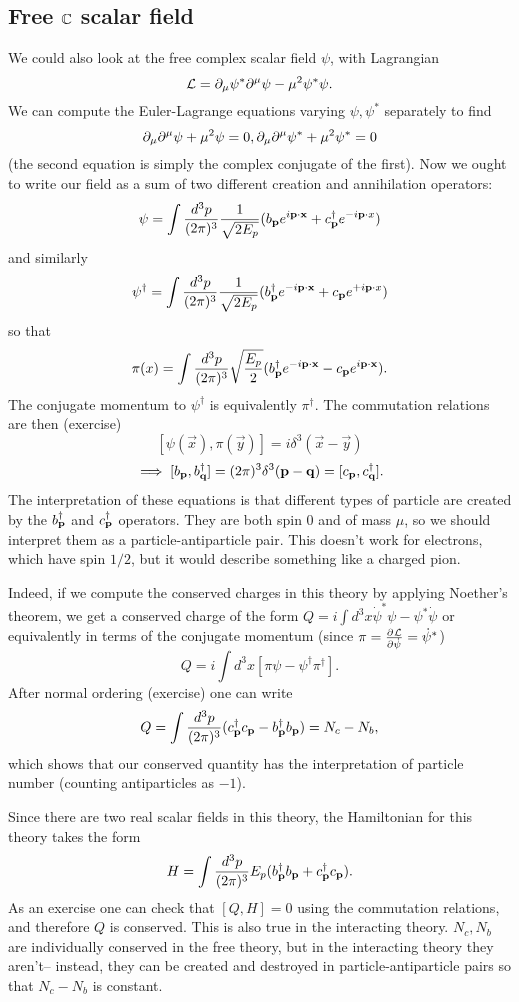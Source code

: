 \subsection*{Free $\mathbb{C}$ scalar field} We could also look at the free complex scalar field $\psi$, with Lagrangian
$$\mathcal L = \partial_\mu \psi^* \partial^\mu \psi - \mu^2 \psi^* \psi.$$
We can compute the Euler-Lagrange equations varying $\psi,\psi^*$ separately to find
$$\partial_\mu \partial^\mu \psi + \mu^2 \psi=0,\partial_\mu \partial^\mu \psi^*+\mu^2 \psi^*=0$$
(the second equation is simply the complex conjugate of the first).
Now we ought to write our field as a sum of two different creation and annihilation operators:
$$\psi=\int \frac{d^3p}{(2\pi)^3}\frac{1}{\sqrt{2E_p}} (b_{\boldsymbol{\mathbf{p}}} e^{i \boldsymbol{\mathbf{p}} \cdot \boldsymbol{\mathbf{x}}} + c_{\boldsymbol{\mathbf{p}}}^\dagger e^{-i \boldsymbol{\mathbf{p}} \cdot x})$$
and similarly
$$\psi^\dagger=\int \frac{d^3p}{(2\pi)^3} \frac{1}{\sqrt{2E_p}} (b_{\boldsymbol{\mathbf{p}}}^\dagger e^{-i \boldsymbol{\mathbf{p}} \cdot \boldsymbol{\mathbf{x}}} + c_{\boldsymbol{\mathbf{p}}} e^{+i \boldsymbol{\mathbf{p}} \cdot x})$$
so that
$$\pi(x)=\int \frac{d^3p}{(2\pi)^3} \sqrt{\frac{E_p}{2}} (b_{\boldsymbol{\mathbf{p}}}^\dagger e^{-i \boldsymbol{\mathbf{p}} \cdot \boldsymbol{\mathbf{x}}}-c_{\boldsymbol{\mathbf{p}}} e^{i \boldsymbol{\mathbf{p}} \cdot \boldsymbol{\mathbf{x}}}).$$
The conjugate momentum to $\psi^\dagger$ is equivalently $\pi^\dagger$. The commutation relations are then (exercise)
$$[\psi(\vec x), \pi(\vec y)]=i\delta^3(\vec x - \vec y)$$
$$\implies [b_{\boldsymbol{\mathbf{p}}},b_{\boldsymbol{\mathbf{q}}}^\dagger]=(2\pi)^3 \delta^3 (\boldsymbol{\mathbf{p}} - \boldsymbol{\mathbf{q}})=[c_{\boldsymbol{\mathbf{p}}},c_{\boldsymbol{\mathbf{q}}}^\dagger].$$
The interpretation of these equations is that different types of particle are created by the $b_{\boldsymbol{\mathbf{p}}}^\dagger$ and $c_{\boldsymbol{\mathbf{p}}}^\dagger$ operators. They are both spin $0$ and of mass $\mu$, so we should interpret them as a particle-antiparticle pair. This doesn't work for electrons, which have spin $1/2$, but it would describe something like a charged pion.

Indeed, if we compute the conserved charges in this theory by applying Noether's theorem, we get a conserved charge of the form
$Q=i\int d^3 x \dot \psi^* \psi - \psi^* \dot \psi$ or equivalently in terms of the conjugate momentum (since $\pi = \frac{\partial^{} \mathcal L}{\partial \dot \psi ^{}}=\dot \psi^*$)
$$Q=i\int d^3 x [\pi \psi - \psi^\dagger \pi^\dagger].$$
After normal ordering (exercise) one can write
$$Q=\int \frac{d^3 p}{(2\pi)^3} (c_{\boldsymbol{\mathbf{p}}}^\dagger c_{\boldsymbol{\mathbf{p}}}- b_{\boldsymbol{\mathbf{p}}}^\dagger b_{\boldsymbol{\mathbf{p}}})=N_c-N_b,$$
which shows that our conserved quantity has the interpretation of particle number (counting antiparticles as $-1$).

Since there are two real scalar fields in this theory, the Hamiltonian for this theory takes the form
$$H=\int \frac{d^3p}{(2\pi)^3} E_p(b_{\boldsymbol{\mathbf{p}}}^\dagger b_{\boldsymbol{\mathbf{p}}}+c_{\boldsymbol{\mathbf{p}}}^\dagger c_{\boldsymbol{\mathbf{p}}}).$$
As an exercise one can check that $[Q,H]=0$ using the commutation relations, and therefore $Q$ is conserved. This is also true in the interacting theory. $N_c,N_b$ are individually conserved in the free theory, but in the interacting theory they aren't-- instead, they can be created and destroyed in particle-antiparticle pairs so that $N_c-N_b$ is constant.